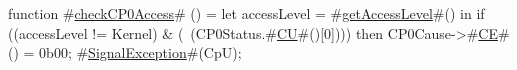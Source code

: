 function #\hyperref[zcheckCPzeroAccess]{checkCP0Access}# () =
  {
    let accessLevel = #\hyperref[zgetAccessLevel]{getAccessLevel}#() in
    if ((accessLevel != Kernel) & (~(CP0Status.#\hyperref[zCU]{CU}#()[0]))) then
      {
        CP0Cause->#\hyperref[zCE]{CE}#() = 0b00;
        #\hyperref[zSignalException]{SignalException}#(CpU);
      }
  }
